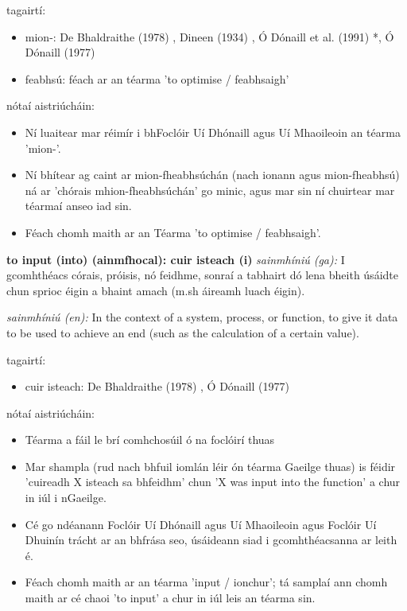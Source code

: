\documentclass{article}
\begin{document}
tagairtí:
\begin{itemize}
	\item mion-: De Bhaldraithe (1978) \cite{de-bhaldraithe}, Dineen (1934) \cite{dineen}, Ó Dónaill et al. (1991) \cite{focloir-beag}*, Ó Dónaill (1977) \cite{odonaill}
	\item feabhsú: féach ar an téarma 'to optimise / feabhsaigh'
\end{itemize}

nótaí aistriúcháin:
\begin{itemize}
	\item Ní luaitear mar réimír i bhFoclóir Uí Dhónaill agus Uí Mhaoileoin an téarma 'mion-'.
	\item Ní bhítear ag caint ar mion-fheabhsúchán (nach ionann agus mion-fheabhsú) ná ar 'chórais mhion-fheabhsúchán' go minic, agus mar sin ní chuirtear mar téarmaí anseo iad sin.
	\item Féach chomh maith ar an Téarma 'to optimise / feabhsaigh'.
\end{itemize}


\textbf{to input (into) (ainmfhocal): cuir isteach (i)}
\textit{sainmhíniú (ga):} I gcomhthéacs córais, próisis, nó feidhme, sonraí a tabhairt dó lena bheith úsáidte chun sprioc éigin a bhaint amach (m.sh áireamh luach éigin).

\textit{sainmhíniú (en):} In the context of a system, process, or function, to give it data to be used to achieve an end (such as the calculation of a certain value).

tagairtí:
\begin{itemize}
	\item cuir isteach: De Bhaldraithe (1978) \cite{de-bhaldraithe}, Ó Dónaill (1977) \cite{odonaill}
\end{itemize}

nótaí aistriúcháin:
\begin{itemize}
	\item Téarma a fáil le brí comhchosúil ó na foclóirí thuas
	\item Mar shampla (rud nach bhfuil iomlán léir ón téarma Gaeilge thuas) is féidir 'cuireadh X isteach sa bhfeidhm' chun 'X was input into the function' a chur in iúl i nGaeilge.
	\item Cé go ndéanann Foclóir Uí Dhónaill agus Uí Mhaoileoin agus Foclóir Uí Dhuinín trácht ar an bhfrása seo, úsáideann siad i gcomhthéacsanna ar leith é.
	\item Féach chomh maith ar an téarma 'input / ionchur'; tá samplaí ann chomh maith ar cé chaoi 'to input' a chur in iúl leis an téarma sin.
\end{itemize}
\end{document}
